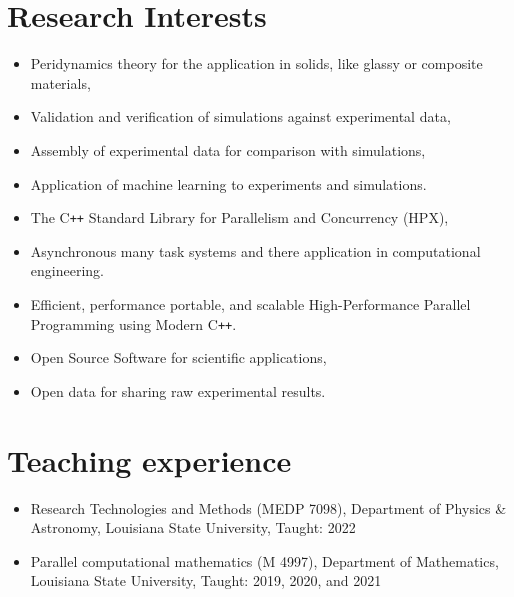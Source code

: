 \documentclass[11pt,a4paper,sans]{moderncv}
\begin{document}
\section{Research Interests}

\begin{itemize}[leftmargin=4cm]
\item Peridynamics theory for the application in solids, like glassy or composite materials,
\item Validation and verification of simulations against experimental data,
\item Assembly of experimental data for comparison with simulations,
\item Application of machine learning to experiments and simulations.
\end{itemize}
\begin{itemize}[leftmargin=4cm]
\item The C\texttt{++} Standard Library for Parallelism and Concurrency (HPX),
\item Asynchronous many task systems and there application in computational engineering.
\item Efficient, performance portable, and scalable High-Performance Parallel Programming using Modern C\texttt{++}.
\end{itemize}
\begin{itemize}[leftmargin=4cm]
\item Open Source Software for scientific applications,
\item Open data for sharing raw experimental results.
\end{itemize}
\section{Teaching experience}
\begin{itemize}[leftmargin=4cm]
\item Research Technologies and Methods (MEDP 7098), Department of Physics \& Astronomy, Louisiana State University, Taught: 2022
\item Parallel computational mathematics (M 4997), Department of Mathematics,  Louisiana State University, Taught: 2019, 2020, and 2021
\end{itemize}
\end{document}
